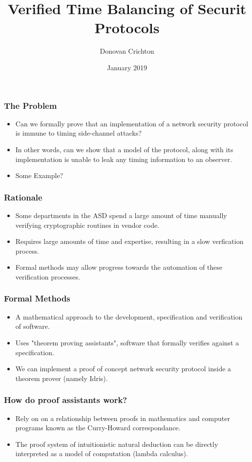 \documentclass{beamer}
\title{Verified Time Balancing of Securit Protocols}
\author{Donovan Crichton}
\date{January 2019}
\begin{document}
 
\frame{\titlepage}

\begin{frame}[fragile]
  \frametitle{The Problem}
  \begin{itemize}
    \item Can we formally prove that an implementation of
            a network security protocol is immune to 
                  timing side-channel attacks?
    \item In other words, can we show that a model of the protocol,
            along with its implementation is unable to leak
                  any timing information to an observer.
    \item Some Example?
  \end{itemize}
\end{frame}

\begin{frame}[fragile]
  \frametitle{Rationale}
  \begin{itemize}
    \item Some departments in the ASD spend a large amount of time
            manually verifying cryptographic routines in vendor
            code.
    \item Requires large amounts of time and expertise, resulting
            in a slow verfication process.
    \item Formal methods may allow progress towards the 
            automation of these verification processes.
  \end{itemize}
\end{frame}

\begin{frame}[fragile]
  \frametitle{Formal Methods}
    \begin{itemize}
      \item A mathematical approach to the 
              development, specification and verification of 
                    software.
      \item Uses "theorem proving assistants", software that
              formally verifies against a specification.
      \item We can implement a proof of concept network security 
              protocol inside a theorem prover (namely Idris).
    \end{itemize}
\end{frame}

\begin{frame}[fragile]
  \frametitle{How do proof assistants work?}
    \begin{itemize}
      \item Rely on on a relationship between proofs in mathematics
              and computer programs known as the Curry-Howard 
                    correspondance.
      \item The proof system of intuitionistic 
              natural deduction can be directly interpreted 
                    as a model of computation (lambda calculus).
    \end{itemize}
\end{frame}
\end{document}
